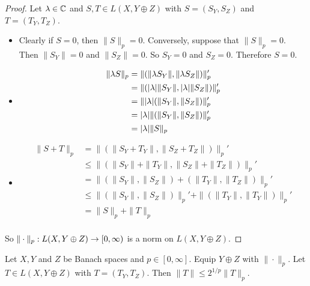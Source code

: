 \documentclass{book}
\begin{document}
	\begin{proof}
	Let $\lambda \in \mathbb{C}$ and $S, T \in L(X, Y \oplus Z)$ with $S= (S_Y, S_Z)$ and $T = (T_Y, T_Z)$. 
	\begin{itemize}
	\item Clearly if $S = 0$, then $\|S\|_p = 0$. Conversely, suppose that $\|S\|_p = 0$. Then $\|S_Y\| = 0$ and $\|S_Z\| = 0$. So $S_Y = 0$ and $S_Z = 0$. Therefore $S = 0$. 
	\item 
	\begin{align*}
	\|\lambda S\|_p
	&= \|(\|\lambda S_Y\|, \|\lambda S_Z\|)\|_p' \\
	&= \|(|\lambda|\| S_Y\|, |\lambda|\|S_Z \|)\|_p' \\
	&= \||\lambda| (\| S_Y\|,\|S_Z\| )\|_p' \\
	&= |\lambda| \|(\| S_Y\|,\|S_Z\|)\|_p' \\
	&= |\lambda| \| S\|_p
	\end{align*}
	\item 
	\begin{align*}
	\|S + T\|_p
	&= \|(\|S_Y + T_Y\|, \|S_Z + T_Z\|)\|_p' \\
	&\leq \|(\|S_Y\| + \|T_Y\|, \|S_Z\| + \|T_Z\|)\|_p' \\
	&= \|(\|S_Y\|, \|S_Z\|) + (\|T_Y\|, \|T_Z\|)\|_p' \\
	&\leq \|(\|S_Y\|, \|S_Z\|)\|_p' + \|(\|T_Y\|, \|T_Y\|)\|_p' \\
	&= \|S\|_p + \|T\|_p \\ 
	\end{align*}
	\end{itemize}
	So $\|\cdot \|_p: L(X, Y \oplus Z) \rightarrow [0,\infty)$ is a norm on $L(X, Y \oplus Z)$. 
	\end{proof}
	
	
	\begin{ex}
	Let $X, Y$ and $Z$ be Banach spaces and $p \in [0, \infty]$. Equip $Y \oplus Z$ with $\|\cdot\|_p$. Let $T \in L(X, Y \oplus Z)$ with $T = (T_Y, T_Z)$. Then $\|T\|\leq 2^{1/p}\|T\|_p$.
	\end{ex}
	
\end{document}
